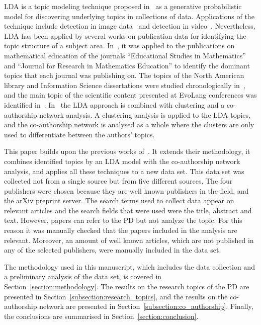 \documentclass{article}
\theoremstyle{definition}
\begin{document}
LDA is a topic modeling technique proposed
in~\cite{Blei2003} as a generative probabilistic model for discovering
underlying topics in collections of data.
Applications of the technique include detection in image data~\cite{
Coelho2010} and detection in video~\cite{Wang2008}. Nevertheless,
LDA has been applied by several works on publication data for identifying the
topic structure of a subject area. In~\cite{Inglis2018}, it was applied to the
publications on mathematical education of the journals ``Educational Studies in
Mathematics'' and ``Journal for Research in Mathematics Education'' to
identify the dominant topics that each journal was publishing on. The topics of
the North American library and Information Science dissertations were 
studied chronologically in~\cite{Sugimoto2011}, and the main topic of the
scientific content presented at EvoLang conferences was identified
in~\cite{Bergmann2018}. In~\cite{Bergmann2018} the LDA approach is combined with
clustering and a co-authorship network analysis. A clustering analysis is
applied to the LDA topics, and the co-authorship network is analysed as a whole
where the clusters are only used to differentiate between the authors' topics.

This paper builds upon the previous works of~\cite{Bergmann2018, Liu2015,
youngblood2018}. It extends their methodology, it combines identified topics by
an LDA model with the co-authorship network analysis, and applies all these
techniques to a new data set. This data set was collected not from a single
source but from five different sources. The four publishers were chosen because
they are well known publishers in the field, and the arXiv preprint server. 
The search
terms used to collect data appear on relevant articles and the search fields
that were used were the title, abstract and text. However, papers can refer to
the PD but not analyze the topic. For this reason it was manually checked that
the papers included in the analysis are relevant. Moreover, an amount of well
known articles, which are not published in any of the selected publishers, were
manually included in the data set.


The methodology used in this manuscript, which
includes the data collection and a preliminary analysis of the data set, is
covered in Section~\ref{section:methodology}. The results on the research topics
of the PD are presented in Section~\ref{subsection:research_topics}, and the
results on the co-authorship network are presented in
Section~\ref{subsection:co_authorship}. Finally, the conclusions are summarised
in Section~\ref{section:conclusion}.
\end{document}
